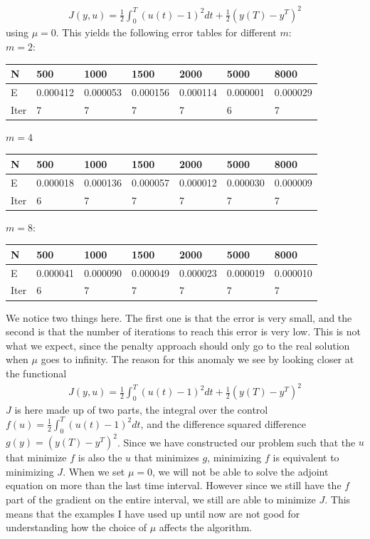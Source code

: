 \documentclass[11pt,a4paper]{article}
\begin{document}
\begin{align*}
J(y,u) = \frac{1}{2}\int_0^T(u(t)-1)^2dt + \frac{1}{2}(y(T)-y^T)^2
\end{align*}
using $\mu=0$. This yields the following error tables for different $m$:
\\
$m=2$:
\begin{center}
    \begin{tabular}{| l | l | l | l | l | l | l |}
    \hline
    N & 500 & 1000  & 1500 & 2000 & 5000 & 8000 \\ \hline
    E & 0.000412 & 0.000053 &0.000156 & 0.000114 & 0.000001 & 0.000029	\\ \hline
    Iter & 7 & 7  & 7 & 7 & 6 & 7 \\ \hline
    \end{tabular}
\end{center}
$m=4$
\begin{center}
    \begin{tabular}{| l | l | l | l | l | l | l |}
    \hline
    N & 500 & 1000  & 1500 & 2000 & 5000 & 8000 \\ \hline
    E & 0.000018 & 0.000136& 0.000057& 0.000012 & 0.000030& 0.000009\\ \hline
    Iter & 6 & 7  & 7 & 7 & 7 & 7 \\ \hline
    \end{tabular}
\end{center}
$m=8$:
\begin{center}
    \begin{tabular}{| l | l | l | l | l | l | l |}
    \hline
    N & 500 & 1000  & 1500 & 2000 & 5000 & 8000 \\ \hline
    E & 0.000041 & 0.000090 &0.000049 & 0.000023 & 0.000019 & 0.000010	\\ \hline
    Iter & 6 & 7& 7 & 7 & 7 & 7 \\ \hline
    \end{tabular}
\end{center}
We notice two things here. The first one is that the error is very small, and the second is that the number of iterations to reach this error is very low. This is not what we expect, since the penalty approach should only go to the real solution when $\mu$ goes to infinity. The reason for this anomaly we see by looking closer at the functional 
\begin{align*}
J(y,u) = \frac{1}{2}\int_0^T(u(t)-1)^2dt + \frac{1}{2}(y(T)-y^T)^2
\end{align*}
$J$ is here made up of two parts, the integral over the control \\$f(u)=\frac{1}{2}\int_0^T(u(t)-1)^2dt $, and the difference squared difference \\$g(y)= (y(T)-y^T)^2$. Since we have constructed our problem such that the $u$ that minimize $f$ is also the $u$ that minimizes $g$, minimizing $f$ is equivalent to minimizing $J$. When we set $\mu=0$, we will not be able to solve the adjoint equation on more than the last time interval. However since we still have the $f$ part of the gradient on the entire interval, we still are able to minimize $J$. This means that the examples I have used up until now are not good for understanding how the choice of $\mu$ affects the algorithm.
\end{document}
